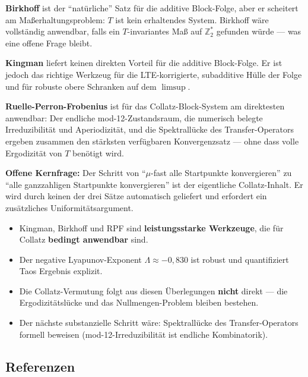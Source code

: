 \documentclass[12pt,a4paper]{article}
\newcommand{\Ztwo}{\mathbb{Z}_2}
\begin{document}
\begin{tcolorbox}[kernidee, title={Zusammenfassung: Drei Werkzeuge, ein Ziel}]
\textbf{Birkhoff} ist der ``natürliche'' Satz für die additive Block-Folge,
aber er scheitert am Maßerhaltungsproblem: $T$ ist kein erhaltendes System.
Birkhoff wäre vollständig anwendbar, falls ein $T$-invariantes Maß auf
$\Ztwo^*$ gefunden würde --- was eine offene Frage bleibt.

\medskip
\textbf{Kingman} liefert keinen direkten Vorteil für die additive Block-Folge.
Er ist jedoch das richtige Werkzeug für die LTE-korrigierte, subadditive
Hülle der Folge und für robuste obere Schranken auf dem $\limsup$.

\medskip
\textbf{Ruelle-Perron-Frobenius} ist für das Collatz-Block-System am
direktesten anwendbar: Der endliche mod-12-Zustandsraum, die numerisch
belegte Irreduzibilität und Aperiodizität, und die Spektrallücke des
Transfer-Operators ergeben zusammen den stärksten verfügbaren Konvergenzsatz
--- ohne dass volle Ergodizität von $T$ benötigt wird.

\medskip
\textbf{Offene Kernfrage:} Der Schritt von ``$\mu$-fast alle Startpunkte
konvergieren'' zu ``alle ganzzahligen Startpunkte konvergieren'' ist der
eigentliche Collatz-Inhalt. Er wird durch keinen der drei Sätze automatisch
geliefert und erfordert ein zusätzliches Uniformitätsargument.
\end{tcolorbox}

\begin{tcolorbox}[warnung, title={Ehrliche Gesamtbilanz}]
\begin{itemize}[nosep]
  \item Kingman, Birkhoff und RPF sind \textbf{leistungsstarke Werkzeuge},
    die für Collatz \textbf{bedingt anwendbar} sind.
  \item Der negative Lyapunov-Exponent $\Lambda \approx -0{,}830$
    ist robust und quantifiziert Taos Ergebnis explizit.
  \item Die Collatz-Vermutung folgt aus diesen Überlegungen \textbf{nicht}
    direkt --- die Ergodizitätslücke und das Nullmengen-Problem bleiben bestehen.
  \item Der nächste substanzielle Schritt wäre: Spektrallücke des
    Transfer-Operators formell beweisen (mod-12-Irreduzibilität ist
    endliche Kombinatorik).
\end{itemize}
\end{tcolorbox}

\subsection{Referenzen}
\end{document}
